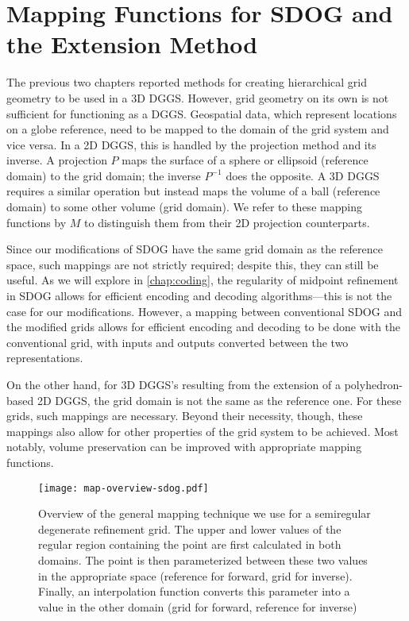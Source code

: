 \chapter{Mapping Functions for SDOG and the Extension Method} \label{chap:mapping}
The previous two chapters reported methods for creating hierarchical grid geometry to be used in a 3D DGGS.
However, grid geometry on its own is not sufficient for functioning as a DGGS.
Geospatial data, which represent locations on a globe reference, need to be mapped to the domain of the grid system and vice versa.
In a 2D DGGS, this is handled by the projection method and its inverse.
A projection $P$ maps the surface of a sphere or ellipsoid (reference domain) to the grid domain; the inverse $P^{-1}$ does the opposite.
A 3D DGGS requires a similar operation but instead maps the volume of a ball (reference domain) to some other volume (grid domain).
We refer to these mapping functions by $M$ to distinguish them from their 2D projection counterparts.


Since our modifications of SDOG have the same grid domain as the reference space, such mappings are not strictly required; despite this, they can still be useful.
As we will explore in \cref{chap:coding}, the regularity of midpoint refinement in SDOG allows for efficient encoding and decoding algorithms---this is not the case for our modifications.
However, a mapping between conventional SDOG and the modified grids allows for efficient encoding and decoding to be done with the conventional grid, with inputs and outputs converted between the two representations.


On the other hand, for 3D DGGS's resulting from the extension of a polyhedron-based 2D DGGS, the grid domain is not the same as the reference one.
For these grids, such mappings are necessary.
Beyond their necessity, though, these mappings also allow for other properties of the grid system to be achieved. Most notably, volume preservation can be improved with appropriate mapping functions.


\begin{figure}[ht!]
	\centering
	\texttt{[image: map-overview-sdog.pdf]}
	\caption[Overview of mapping for semiregular degenerate refinement grids]{
		Overview of the general mapping technique we use for a semiregular degenerate refinement grid.
		The upper and lower values of the regular region containing the point are first calculated in both domains.
		The point is then parameterized between these two values in the appropriate space (reference for forward, grid for inverse).
		Finally, an interpolation function converts this parameter into a value in the other domain (grid for forward, reference for inverse)
	}
	\label{fig:map-overview-sdog}
\end{figure}\textbf{}


